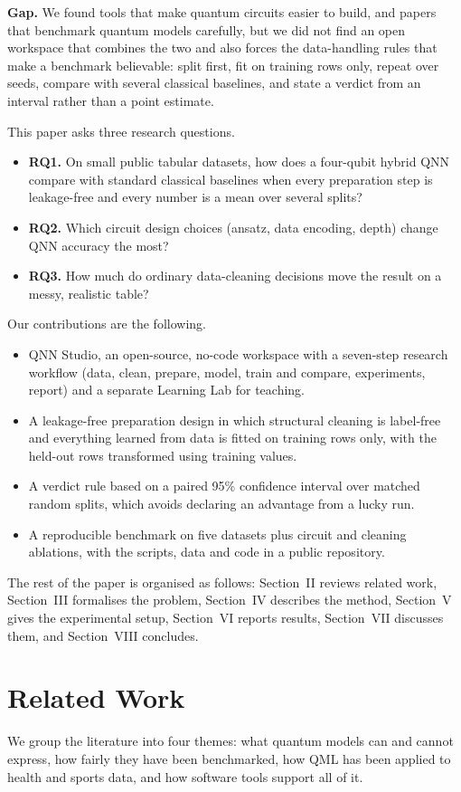 \documentclass[conference]{IEEEtran}
\begin{document}
\textbf{Gap.} We found tools that make quantum circuits easier to build, and papers that benchmark quantum models carefully, but we did not find an open workspace that combines the two and also forces the data-handling rules that make a benchmark believable: split first, fit on training rows only, repeat over seeds, compare with several classical baselines, and state a verdict from an interval rather than a point estimate.

This paper asks three research questions.
\begin{itemize}
  \item \textbf{RQ1.} On small public tabular datasets, how does a four-qubit hybrid QNN compare with standard classical baselines when every preparation step is leakage-free and every number is a mean over several splits?
  \item \textbf{RQ2.} Which circuit design choices (ansatz, data encoding, depth) change QNN accuracy the most?
  \item \textbf{RQ3.} How much do ordinary data-cleaning decisions move the result on a messy, realistic table?
\end{itemize}

Our contributions are the following.
\begin{itemize}
  \item QNN Studio, an open-source, no-code workspace with a seven-step research workflow (data, clean, prepare, model, train and compare, experiments, report) and a separate Learning Lab for teaching.
  \item A leakage-free preparation design in which structural cleaning is label-free and everything learned from data is fitted on training rows only, with the held-out rows transformed using training values.
  \item A verdict rule based on a paired 95\% confidence interval over matched random splits, which avoids declaring an advantage from a lucky run.
  \item A reproducible benchmark on five datasets plus circuit and cleaning ablations, with the scripts, data and code in a public repository.
\end{itemize}

The rest of the paper is organised as follows: Section~II reviews related work, Section~III formalises the problem, Section~IV describes the method, Section~V gives the experimental setup, Section~VI reports results, Section~VII discusses them, and Section~VIII concludes.

\section{Related Work}
We group the literature into four themes: what quantum models can and cannot express, how fairly they have been benchmarked, how QML has been applied to health and sports data, and how software tools support all of it.
\end{document}
